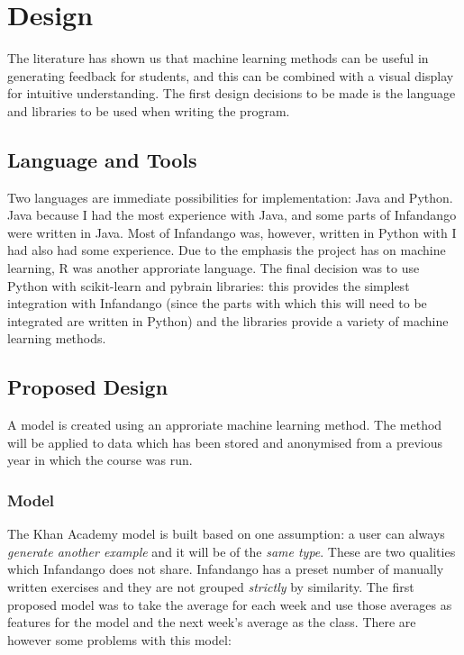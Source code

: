 \chapter{Design}
\label{design}
The literature has shown us that machine learning methods can be useful in generating feedback for students, and this can be combined with a visual display for intuitive understanding. The first design decisions to be made is the language and libraries to be used when writing the program.
\section{Language and Tools}
Two languages are immediate possibilities for implementation: Java\cite{java_site} and Python\cite{python_site}. Java because I had the most experience with Java, and some parts of Infandango were written in Java. Most of Infandango was, however, written in Python with I had also had some experience. Due to the emphasis the project has on machine learning, R\cite{r_site} was another approriate language. 
The final decision was to use Python with scikit-learn\cite{scikit_site} and pybrain\cite{pybrain_site} libraries: this provides the simplest integration with Infandango (since the parts with which this will need to be integrated are written in Python) and the libraries provide a variety of machine learning methods.

\section{Proposed Design}
A model is created using an approriate machine learning method. The method will be applied to data which has been stored and anonymised from a previous year in which the course was run. 
\subsection{Model}
The Khan Academy model is built based on one assumption: a user can always \emph{generate another example} and it will be of the \emph{same type}. These are two qualities which Infandango does not share. Infandango has a preset number of manually written exercises and they are not grouped \emph{strictly} by similarity. The first proposed model was to take the average for each week and use those averages as features for the model and the next week's average as the class. There are however some problems with this model:

